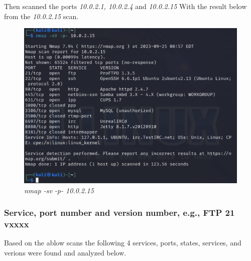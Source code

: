 Then scanned the ports \textit{10.0.2.1, 10.0.2.4} and \textit{10.0.2.15}
With the result below from the \textit{10.0.2.15} scan.

\begin{figure}[H]
    \centering
    \includegraphics[width=\linewidth]{pic/nmap sv.png}
    \caption{\textit{nmap -sv -p- 10.0.2.15}}
    \label{fig:nmap sv}
\end{figure}

\subsubsection{Service, port number and version number, e.g., FTP 21 vxxxx}
Based on the ablow scans the following 4 services, ports, states, services, and verions were found and analyzed below.

